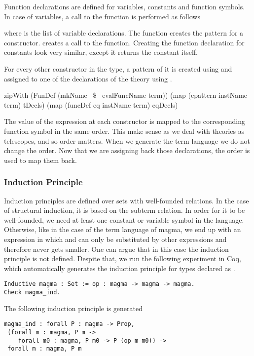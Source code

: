Function declarations are defined for variables, constants and function symbols. In case of variables, a call to the  function is performed as follows 
\begin{hscode}
\end{hscode}
\noindent where  is the list of variable declarations. The function  creates the pattern for a constructor.  creates a call to the  function. Creating the function declaration for constants look very similar, except it returns the constant itself. 
\begin{hscode}
\end{hscode}
For every other constructor in the type, a pattern of it is created using  and assigned to one of the declarations of the theory using . 
\begin{hscode}
zipWith (FunDef (mkName ~$\$$~  evalFuncName term)) 
        (map (cpattern instName term) tDecls)
        (map (funcDef eq instName term) eqDecls)
\end{hscode}
The value of the expression at each constructor is mapped to the corresponding function symbol in the same order. This make sense as we deal with theories as telescopes, and so order matters. When we generate the term language we do not change the order. Now that we are assigning back those declarations, the order is used to map them back. 


\subsubsection{Induction Principle}
\label{sec:generation:induction}
Induction principles are defined over sets with well-founded relations. In the case of structural induction, it is based on the subterm relation. In order for it to be well-founded, we need at least one constant or variable symbol in the language. Otherwise, like in the case of the  term language of magma, we end up with an expression  in which  and  can only be substituted by other  expressions and therefore never gets smaller. One can argue that in this case the induction principle is not defined. Despite that, we run the following experiment in Coq, which automatically generates the induction principle for types declared as . 
 \begin{verbatim}
Inductive magma : Set := op : magma -> magma -> magma.
Check magma_ind.
\end{verbatim}
The following induction principle is generated 
\begin{verbatim}
magma_ind : forall P : magma -> Prop,
 (forall m : magma, P m ->
    forall m0 : magma, P m0 -> P (op m m0)) ->
 forall m : magma, P m
\end{verbatim}

